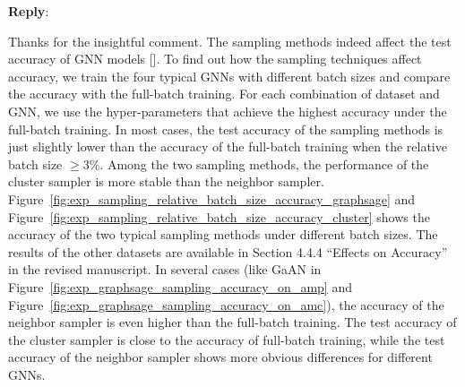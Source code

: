\documentclass[12pt]{article}
\newenvironment{reply}
   {\medskip \noindent \textbf{Reply}:\  }
   {\medskip}
\begin{document}
\begin{reply}

    Thanks for the insightful comment.
    The sampling methods indeed affect the test accuracy of GNN models [\cite{hamilton2017_graphsage, chiang2019_cluster_gcn, zeng2020_graphsaint}].
    To find out how the sampling techniques affect accuracy, we train the four typical GNNs with different batch sizes and compare the accuracy with the full-batch training.
    For each combination of dataset and GNN, we use the hyper-parameters that achieve the highest accuracy under the full-batch training.
    In most cases, the test accuracy of the sampling methods is just slightly lower than the accuracy of the full-batch training when the relative batch size $\geq 3\%$.
    Among the two sampling methods, the performance of the cluster sampler is more stable than the neighbor sampler.
    Figure~\ref{fig:exp_sampling_relative_batch_size_accuracy_graphsage} and Figure~\ref{fig:exp_sampling_relative_batch_size_accuracy_cluster} shows the accuracy of the two typical sampling methods under different batch sizes.
    The results of the other datasets are available in Section 4.4.4 ``Effects on Accuracy'' in the revised manuscript.
    In several cases (like GaAN in Figure~\ref{fig:exp_graphsage_sampling_accuracy_on_amp} and Figure~\ref{fig:exp_graphsage_sampling_accuracy_on_amc}), the accuracy of the neighbor sampler is even higher than the full-batch training.
    The test accuracy of the cluster sampler is close to the accuracy of full-batch training, while the test accuracy of the neighbor sampler shows more obvious differences for different GNNs.
        


\end{reply}
\end{document}
